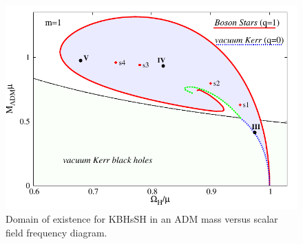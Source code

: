 \documentclass[twocolumn,aps,showpacs,showkeys,prd,superscriptaddress,byrevtex, amsmath]{revtex4-1}
\begin{document}
\begin{figure}
\centering
\includegraphics[scale=0.7]{figures/existence-eps-converted-to.pdf}
\caption{Domain of existence for KBHsSH in an ADM mass versus scalar
field frequency diagram. }
\label{existence}
\end{figure}
\end{document}
